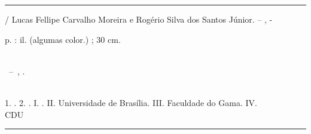 \begin{fichacatalografica}
	\vspace*{\fill}					%
	\hrule							%
	\begin{center}					%
	\begin{minipage}[c]{12.5cm}		%
	
	\imprimirautor
	
	\hspace{0.5cm} \imprimirtitulo  / Lucas Fellipe Carvalho Moreira e Rogério Silva dos Santos Júnior. --
	\imprimirlocal, \imprimirdata-
	
	\hspace{0.5cm} \pageref{LastPage} p. : il. (algumas color.) ; 30 cm.\\
	
	\hspace{0.5cm} \imprimirorientadorRotulo~\imprimirorientador\\
	
	\hspace{0.5cm}
	\parbox[t]{\textwidth}{\imprimirtipotrabalho~--~\imprimirinstituicao,
	\imprimirdata.}\\
	
	\hspace{0.5cm}
		1. \imprimirpalavrachaveum.
		2. \imprimirpalavrachavedois.
		I. \imprimirorientador.
		II. Universidade de Brasília.
		III. Faculdade do Gama.
		IV. \imprimirtitulo\\ 			
	
	\hspace{8.75cm} CDU \nomecdu\\
	
	\end{minipage}
	\end{center}
	\hrule
\end{fichacatalografica}
